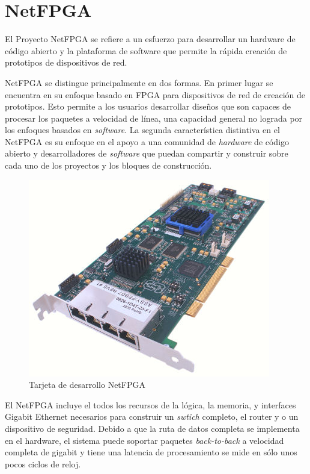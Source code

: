 
\section{NetFPGA}

El Proyecto NetFPGA se refiere a un esfuerzo para desarrollar un hardware de
código abierto y la plataforma de software que permite la rápida creación de
prototipos de dispositivos de red. 

NetFPGA se distingue principalmente en dos formas. En primer lugar se encuentra
en su enfoque basado en FPGA para dispositivos de red de creación de prototipos.
Esto permite a los usuarios desarrollar diseños que son capaces de procesar los
paquetes a velocidad de línea, una capacidad general no lograda por los
enfoques basados en \emph{software}. La segunda característica distintiva en el 
NetFPGA es su enfoque en el apoyo a una comunidad de \emph{hardware} de código
abierto y desarrolladores de \emph{software} que puedan compartir y construir
sobre cada uno de los proyectos y los bloques de construcción\cite{netfpga1}.

\begin{figure}[ht]
 \centering
 \includegraphics[scale=.50]{./figuras/netfpga.jpg}
 \caption{Tarjeta de desarrollo NetFPGA}
 \label{Tarjeta de desarrollo NetFPGA}
\end{figure}


El NetFPGA incluye el todos los recursos de la lógica, la memoria, y
interfaces Gigabit Ethernet necesarios para construir un \emph{swtich} completo,
el router y  o  un dispositivo de seguridad. Debido a que la ruta de datos
completa se implementa en el hardware, el sistema puede soportar paquetes 
\emph{back-to-back} a velocidad completa de gigabit y tiene una
latencia de procesamiento se mide en sólo unos pocos ciclos de reloj.



